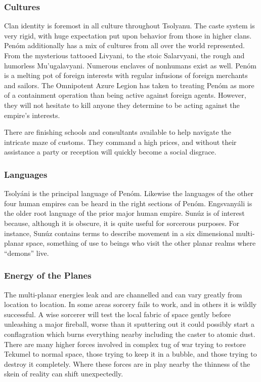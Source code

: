 \subsubsection{Cultures}

Clan identity is foremost in all culture throughout Tsolyanu. The caste system is very rigid, with huge expectation put upon behavior from those in higher clans. Penóm additionally has a mix of cultures from all over the world represented. From the mysterious tattooed Livyani, to the stoic Salarvyani, the rough and humorless Mu'ugalavyani. Numerous enclaves of nonhumans exist as well. Penóm is a melting pot of foreign interests with regular infusions of foreign merchants and sailors. The Omnipotent Azure Legion has taken to treating Penóm as more of a containment operation than being active against foreign agents.  However, they will not hesitate to kill anyone they determine to be acting against the empire's interests.

There are finishing schools and consultants available to help navigate the intricate maze of customs. They command a high prices, and without their assistance a party or reception will quickly become a social disgrace.

\subsubsection{Languages}

Tsolyáni is the principal language of Penóm. Likewise the languages of the other four human empires can be heard in the right sections of Penóm. Engsvanyáli is the older root language of the prior major human empire. Sunúz is of interest because, although it is obscure, it is quite useful for sorcerous purposes. For instance, Sunúz contains terms to describe movement in a six dimensional multi-planar space, something of use to beings who visit the other planar realms where ``demons'' live.

\subsubsection{Energy of the Planes}

The multi-planar energies leak and are channelled and can vary greatly from location to location. In some areas sorcery fails to work, and in others it is wildly successful. A wise sorcerer will test the local fabric of space gently before unleashing a major fireball, worse than it sputtering out it could possibly start a conflagration which burns everything nearby including the caster to atomic dust. There are many higher forces involved in complex tug of war trying to restore Tekumel to normal space, those trying to keep it in a bubble, and those trying to destroy it completely. Where these forces are in play nearby the thinness of the skein of reality can shift unexpectedly.

